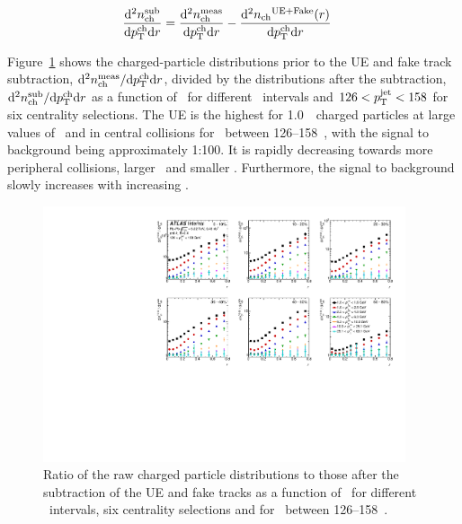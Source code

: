 \begin{align}
\frac{\mathrm{d}^2 \mbox{$n_{\mathrm{ch}}^{\mathrm{sub}}$} }{ \mathrm{d} \mbox{$p_{\mathrm{T}}^{\mathrm{ch}}$} \mathrm{d} r } &=  \frac{\mathrm{d}^2 \mbox{$n_{\mathrm{ch}}^{\mathrm{meas}}$} }{ \mathrm{d} \mbox{$p_{\mathrm{T}}^{\mathrm{ch}}$} \mathrm{d} r} -  \frac{ \mathrm{d}^2 \mbox{$n_{\mathrm{ch}}$}^{\mathrm{UE+Fake}}(r)  }{ \mathrm{d} \mbox{$p_{\mathrm{T}}^{\mathrm{ch}}$} \mathrm{d} r} 
\end{align}

Figure~\ref{fig:UEsize} shows the charged-particle distributions prior to the UE and fake track subtraction, $ \mathrm{d}^2 \mbox{$n_{\mathrm{ch}}^{\mathrm{meas}}$} / \mathrm{d} \mbox{$p_{\mathrm{T}}^{\mathrm{ch}}$} \mathrm{d} r$, divided by the distributions after the subtraction, $ \mathrm{d}^2 \mbox{$n_{\mathrm{ch}}^{\mathrm{sub}}$} / \mathrm{d} \mbox{$p_{\mathrm{T}}^{\mathrm{ch}}$} \mathrm{d} r $ as a function of \rvar\ for different \pttrk\ intervals and $126 < \mbox{$p_{\mathrm{T}}^{\mathrm{jet}}$} < 158$ \GeV for six centrality selections. The UE is the highest for 1.0~\GeV\ charged particles at large values of \rvar\ and in central collisions for \ptjet\ between 126--158~\GeV, with the signal to background being approximately 1:100. It is rapidly decreasing towards more peripheral collisions, larger \pttrk\ and smaller \rvar. Furthermore, the signal to background
slowly increases with increasing \ptjet.

\begin{figure}
\centerline{
 \includegraphics[width=0.95\textwidth]{figures/performance/UE_B2S_single_0.pdf} }
\caption{ Ratio of the raw charged particle distributions to those after the subtraction of the UE and fake tracks as a function of \rvar\ for different \pttrk\ intervals, six centrality selections and for \ptjet\ between 126--158~\GeV.}
\label{fig:UEsize}
\end{figure}



